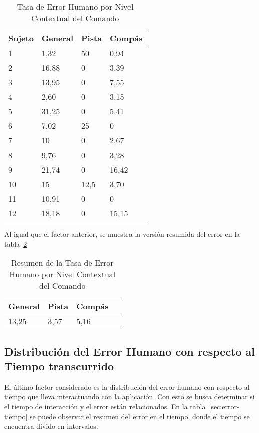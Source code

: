 \begin{table}[H]
\centering
\footnotesize
\begin{tabular}{|p{1.6cm}|p{1.6cm}|p{1.6cm}|p{1.6cm}|}
\hline
    Sujeto & General & Pista & Comp\'as \\
    \hline
1 & 1,32  & 50     & 0,94 \\
2 & 16,88 & 0      & 3,39 \\
3 & 13,95 & 0      & 7,55 \\
4 & 2,60 & 0      & 3,15 \\
5 & 31,25 & 0      & 5,41 \\
6 & 7,02 & 25     & 0 \\
7 & 10     & 0      & 2,67 \\
8 & 9,76 & 0      & 3,28 \\
9 & 21,74 & 0      & 16,42 \\
10 & 15     & 12,5 & 3,70 \\
11 & 10,91 & 0      & 0 \\
12 & 18,18 & 0      & 15,15 \\
    \hline
\end{tabular}
\caption{Tasa de Error Humano por Nivel Contextual del Comando}
\label{sec:error-contexto}
\end{table}

Al igual que el factor anterior, se muestra la versi\'on resumida del error en la 
tabla~\ref{sec:error-contexto-resumen}

\begin{table}[H]
\centering
\footnotesize
\begin{tabular}{|p{1.6cm}|p{1.6cm}|p{1.6cm}|p{1.6cm}|}
\hline
    General & Pista & Comp\'as \\
    \hline
    13,25 & 3,57 & 5,16 \\
    \hline
\end{tabular}
\caption{Resumen de la Tasa de Error Humano por Nivel Contextual del Comando}
\label{sec:error-contexto-resumen}
\end{table}

\subsection{Distribuci\'on del Error Humano con respecto al Tiempo transcurrido}

El \'ultimo factor considerado es la distribución del error humano con respecto al tiempo 
que lleva interactuando con la aplicaci\'on. Con esto se busca determinar si el tiempo de interacci\'on 
y el error est\'an relacionados. En la tabla~\ref{sec:error-tiempo} se puede observar
el resumen del error en el tiempo, donde el tiempo se encuentra divido en intervalos.


